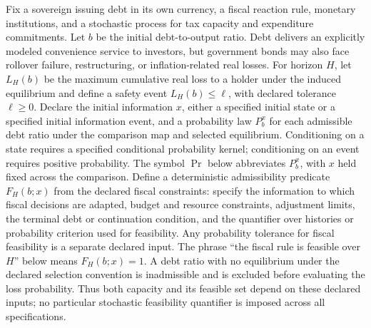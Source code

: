 \documentclass[11pt,a4paper]{article}
\begin{document}
Fix a sovereign issuing debt in its own currency, a fiscal reaction rule, monetary institutions, and a stochastic process for tax capacity and expenditure commitments. Let \(b\) be the initial debt-to-output ratio. Debt delivers an explicitly modeled convenience service to investors, but government bonds may also face rollover failure, restructuring, or inflation-related real losses. For horizon \(H\), let \(L_H(b)\) be the maximum cumulative real loss to a holder under the induced equilibrium and define a safety event \(L_H(b)\le\ell\), with declared tolerance \(\ell\ge0\).
Declare the initial information \(x\), either a specified initial state or a specified initial information event, and a probability law \(P_b^x\) for each admissible debt ratio under the comparison map and selected equilibrium. Conditioning on a state requires a specified conditional probability kernel; conditioning on an event requires positive probability. The symbol \(\Pr\) below abbreviates \(P_b^x\), with \(x\) held fixed across the comparison. Define a deterministic admissibility predicate \(F_H(b;x)\) from the declared fiscal constraints: specify the information to which fiscal decisions are adapted, budget and resource constraints, adjustment limits, the terminal debt or continuation condition, and the quantifier over histories or probability criterion used for feasibility. Any probability tolerance for fiscal feasibility is a separate declared input. The phrase ``the fiscal rule is feasible over \(H\)'' below means \(F_H(b;x)=1\). A debt ratio with no equilibrium under the declared selection convention is inadmissible and is excluded before evaluating the loss probability. Thus both capacity and its feasible set depend on these declared inputs; no particular stochastic feasibility quantifier is imposed across all specifications.
\end{document}
